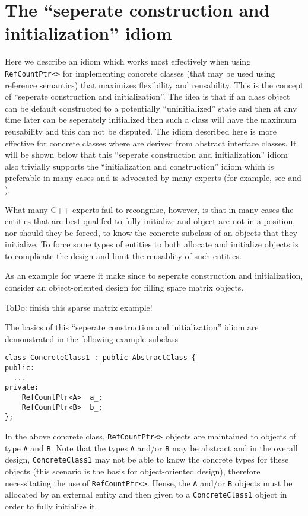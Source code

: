 %
\section{The ``seperate construction and initialization'' idiom}
\label{rcp:apdx:sep-construct-init}
%

Here we describe an idiom which works most effectively when using
{}\texttt{RefCountPtr<>} for implementing concrete classes (that may
be used using reference semantics) that maximizes flexibility and
reusability.  This is the concept of ``seperate construction and
initialization''.  The idea is that if an class object can be default
constructed to a potentially ``uninitialized'' state and then at any
time later can be seperately initialized then such a class will have
the maximum reusability and this can not be disputed.  The idiom
described here is more effective for concrete classes where are
derived from abstract interface classes.  It will be shown below that
this ``seperate construction and initialization'' idiom also trivially
supports the ``initialization and construction'' idiom which is
preferable in many cases and is advocated by many experts (for
example, see {}\cite[Section 10.2.3]{ref:stroustrup_2000} and
{}\cite[Item 4]{ref:meyers_1996}).

What many C++ experts fail to recongnise, however, is that in many
cases the entities that are best qualifed to fully initialize and
object are not in a position, nor should they be forced, to know the
concrete subclass of an objects that they initialize.  To force some
types of entities to both allocate and initialize objects is to complicate the
design and limit the reusablity of such entities.

As an example for where it make since to seperate construction and
initialization, consider an object-oriented design for filling spare
matrix objects.

ToDo: finish this sparse matrix example!

The basics of this ``seperate construction and initialization'' idiom
are demonstrated in the following example subclass
%
{\scriptsize\begin{verbatim}
class ConcreteClass1 : public AbstractClass {
public:
  ...
private:
    RefCountPtr<A>  a_;
    RefCountPtr<B>  b_;
};
\end{verbatim}}
%
{}\noindent{}In the above concrete class, {}\texttt{RefCountPtr<>}
objects are maintained to objects of type {}\texttt{A} and
{}\texttt{B}.  Note that the types {}\texttt{A} and/or {}\texttt{B}
may be abstract and in the overall design, {}\texttt{ConcreteClass1}
may not be able to know the concrete types for these objects (this
scenario is the basis for object-oriented design), therefore
necessitating the use of {}\texttt{RefCountPtr<>}.  Hense, the
{}\texttt{A} and/or {}\texttt{B} objects must be allocated by an
external entity and then given to a {}\texttt{ConcreteClass1} object
in order to fully initialize it.

